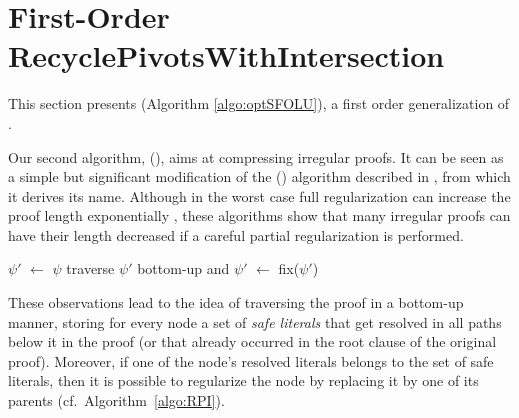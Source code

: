 \section{First-Order RecyclePivotsWithIntersection}
\label{sec:FORPI}
This section presents {\FORPI} (Algorithm \ref{algo:optSFOLU}), a first order generalization of {\RecyclePivotsIntersection}. 

Our second algorithm, {\RPI} ({\RPI}), aims at compressing irregular proofs. It can be seen as a simple 
but significant modification of the {} ({\RPI}) algorithm described in 
\cite{Bar-IlanFuhrmannHooryShachamStrichman2009Linear-time-reductions-of-resolution-proofs}, 
from which it derives its name. 
Although in the worst case full regularization can increase the proof length exponentially 
\cite{Tseitin1983On-The-Complexity-of-Proofs-in-Propositional-Logics}, these algorithms show that 
many irregular proofs can have their length decreased if a careful partial regularization is performed. 

\newcommand{\la}{\leftarrow}


\begin{algorithm}[!b]
\begin{footnotesize}


\BlankLine

$\psi'$ $\la$ $\psi$\;
traverse $\psi'$ bottom-up and 
$\psi'$ $\la$ fix($\psi'$) \;
\;
\caption{\label{algo:RPI} \texttt{}}
\end{footnotesize}
\end{algorithm}


These observations lead to the idea of traversing the proof in a bottom-up
manner, storing for every node a set of \emph{safe literals} that get resolved
in all paths below it in the proof (or that already occurred in the root clause
of the original proof). Moreover, if one of the node's resolved literals belongs
to the set of safe literals, then it is possible to regularize the node by
replacing it by one of its parents (cf.\ Algorithm~\ref{algo:RPI}). 

